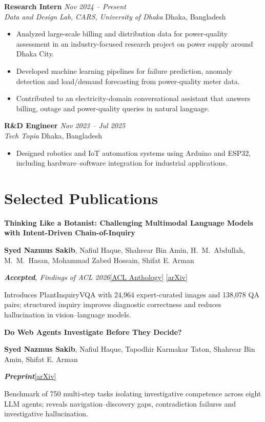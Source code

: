 \documentclass[a4paper,10pt]{article}
\newcommand{\me}{\textbf{Syed Nazmus Sakib}}
\newcommand{\entry}[4]{%
    \noindent\textbf{#1} \hfill \textit{#2} \\
    \textit{\color{descgray}#3} \hfill {\color{descgray}#4}%
}
\newcommand{\pub}[5]{%
    \noindent\textbf{#1}\par
    {\small\color{descgray}#2}\par
    {\small\itshape #3}\hfill #4\par
    {\small\color{descgray}#5}%
    \addvspace{4pt}
}
\newcommand{\status}[1]{{\color{accent}\bfseries #1}}
\begin{document}
\entry{Research Intern}{Nov 2024 -- Present}{Data and Design Lab, CARS, University of Dhaka}{Dhaka, Bangladesh}
\begin{itemize}
    \item Analyzed large-scale billing and distribution data for power-quality assessment in an industry-focused research project on power supply around Dhaka City.
    \item Developed machine learning pipelines for failure prediction, anomaly detection and load/demand forecasting from power-quality meter data.
    \item Contributed to an electricity-domain conversational assistant that answers billing, outage and power-quality queries in natural language.
\end{itemize}
\vspace{3pt}

\entry{R\&D Engineer}{Nov 2023 -- Jul 2025}{Tech Topia}{Dhaka, Bangladesh}
\begin{itemize}
    \item Designed robotics and IoT automation systems using Arduino and ESP32, including hardware--software integration for industrial applications.
\end{itemize}

\section*{Selected Publications}

\pub
{Thinking Like a Botanist: Challenging Multimodal Language Models with Intent-Driven Chain-of-Inquiry}
{\me, Nafiul Haque, Shahrear Bin Amin, H.~M.~Abdullah, M.~M.~Hasan, Mohammad Zabed Hossain, Shifat E. Arman}
{\status{Accepted}, Findings of ACL 2026}
{\href{https://aclanthology.org/2026.findings-acl.1741/}{[ACL Anthology]} \href{https://arxiv.org/abs/2604.20983}{[arXiv]}}
{Introduces PlantInquiryVQA with 24,964 expert-curated images and 138,078 QA pairs; structured inquiry improves diagnostic correctness and reduces hallucination in vision--language models.}

\pub
{Do Web Agents Investigate Before They Decide?}
{\me, Nafiul Haque, Tapodhir Karmakar Taton, Shahrear Bin Amin, Shifat E. Arman}
{\status{Preprint}}
{\href{https://arxiv.org/abs/2602.05354}{[arXiv]}}
{Benchmark of 750 multi-step tasks isolating investigative competence across eight LLM agents; reveals navigation--discovery gaps, contradiction failures and investigative hallucination.}
\end{document}
